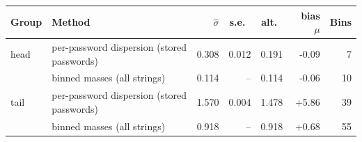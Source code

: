 \begin{tabular}{llrrrrr}
\toprule
Group & Method & $\hat\sigma$ & s.e.\ & alt.\ & bias $\mu$ & Bins \\
\midrule
head & per-password dispersion (stored passwords) & 0.308 & 0.012 & 0.191 & -0.09 & 7 \\
 & binned masses (all strings) & 0.114 & -- & 0.114 & -0.06 & 10 \\
\midrule
tail & per-password dispersion (stored passwords) & 1.570 & 0.004 & 1.478 & +5.86 & 39 \\
 & binned masses (all strings) & 0.918 & -- & 0.918 & +0.68 & 55 \\
\bottomrule
\end{tabular}
